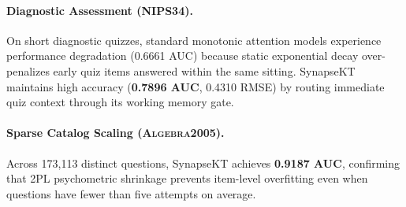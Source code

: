 \documentclass[11pt]{article}
\begin{document}
\paragraph{Diagnostic Assessment (\textsc{NIPS34}).} On short diagnostic quizzes, standard monotonic attention models experience performance degradation (0.6661 AUC) because static exponential decay over-penalizes early quiz items answered within the same sitting. SynapseKT maintains high accuracy (\textbf{0.7896 AUC}, 0.4310 RMSE) by routing immediate quiz context through its working memory gate.

\paragraph{Sparse Catalog Scaling (\textsc{Algebra2005}).} Across 173,113 distinct questions, SynapseKT achieves \textbf{0.9187 AUC}, confirming that 2PL psychometric shrinkage prevents item-level overfitting even when questions have fewer than five attempts on average.
\end{document}
